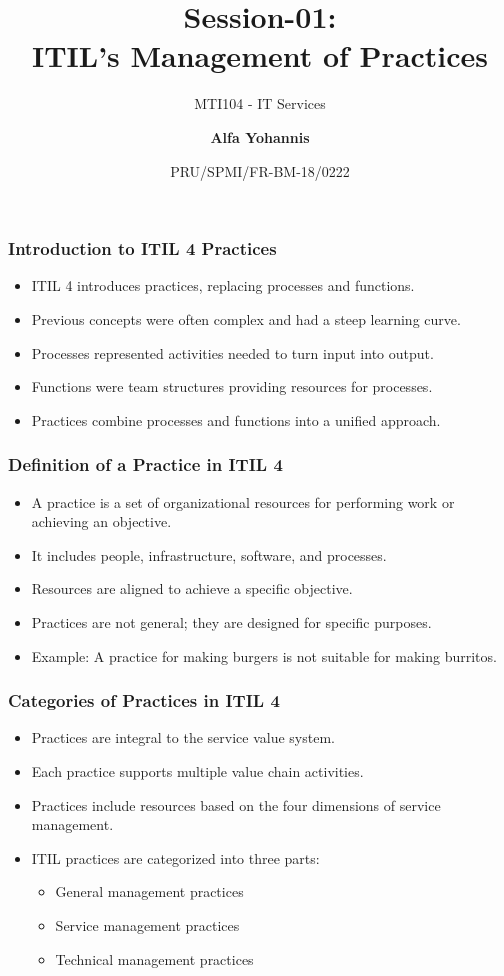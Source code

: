 \documentclass[aspectratio=169, table]{beamer}
\subtitle{MTI104 - IT Services}
\title{Session-01:\\\LARGE{ITIL’s Management of Practices \\}}
\date[Serial]{\scriptsize {PRU/SPMI/FR-BM-18/0222}}
\author[Pradita]{\small{\textbf{Alfa Yohannis}}}
\begin{document}
\frame{\titlepage}

\begin{frame}
	\frametitle{Introduction to ITIL 4 Practices}
	
	\begin{itemize}
		\item ITIL 4 introduces practices, replacing processes and functions.
		\item Previous concepts were often complex and had a steep learning curve.
		\item Processes represented activities needed to turn input into output.
		\item Functions were team structures providing resources for processes.
		\item Practices combine processes and functions into a unified approach.
	\end{itemize}
	
\end{frame}

\begin{frame}
	\frametitle{Definition of a Practice in ITIL 4}
	
	\begin{itemize}
		\item A practice is a set of organizational resources for performing work or achieving an objective.
		\item It includes people, infrastructure, software, and processes.
		\item Resources are aligned to achieve a specific objective.
		\item Practices are not general; they are designed for specific purposes.
		\item Example: A practice for making burgers is not suitable for making burritos.
	\end{itemize}
	
\end{frame}

\begin{frame}
	\frametitle{Categories of Practices in ITIL 4}
	
	\begin{itemize}
		\item Practices are integral to the service value system.
		\item Each practice supports multiple value chain activities.
		\item Practices include resources based on the four dimensions of service management.
		\item ITIL practices are categorized into three parts:
		\begin{itemize}
			\item General management practices
			\item Service management practices
			\item Technical management practices
		\end{itemize}
	\end{itemize}
	
\end{frame}
\end{document}
